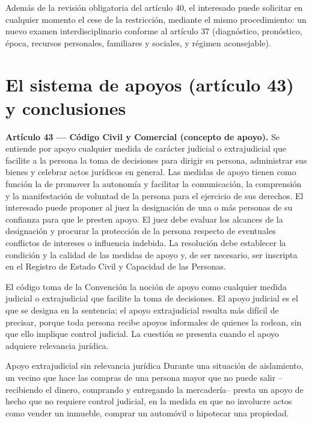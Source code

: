 \documentclass[12pt,oneside]{book}
\begin{document}
Además de la revisión obligatoria del artículo 40, el interesado puede solicitar en cualquier momento el cese de la restricción, mediante el mismo procedimiento: un nuevo examen interdisciplinario conforme al artículo 37 (diagnóstico, pronóstico, época, recursos personales, familiares y sociales, y régimen aconsejable).

\section{El sistema de apoyos (artículo 43) y conclusiones}

\begin{important}
\textbf{Artículo 43 --- Código Civil y Comercial (concepto de apoyo).} Se entiende por apoyo cualquier medida de carácter judicial o extrajudicial que facilite a la persona la toma de decisiones para dirigir su persona, administrar sus bienes y celebrar actos jurídicos en general. Las medidas de apoyo tienen como función la de promover la autonomía y facilitar la comunicación, la comprensión y la manifestación de voluntad de la persona para el ejercicio de sus derechos. El interesado puede proponer al juez la designación de una o más personas de su confianza para que le presten apoyo. El juez debe evaluar los alcances de la designación y procurar la protección de la persona respecto de eventuales conflictos de intereses o influencia indebida. La resolución debe establecer la condición y la calidad de las medidas de apoyo y, de ser necesario, ser inscripta en el Registro de Estado Civil y Capacidad de las Personas.
\end{important}

El código toma de la Convención la noción de apoyo como cualquier medida judicial o extrajudicial que facilite la toma de decisiones. El apoyo judicial es el que se designa en la sentencia; el apoyo extrajudicial resulta más difícil de precisar, porque toda persona recibe apoyos informales de quienes la rodean, sin que ello implique control judicial. La cuestión se presenta cuando el apoyo adquiere relevancia jurídica.

\begin{example}{Apoyo extrajudicial sin relevancia jurídica}
Durante una situación de aislamiento, un vecino que hace las compras de una persona mayor que no puede salir --recibiendo el dinero, comprando y entregando la mercadería-- presta un apoyo de hecho que no requiere control judicial, en la medida en que no involucre actos como vender un inmueble, comprar un automóvil o hipotecar una propiedad.
\end{example}
\end{document}
